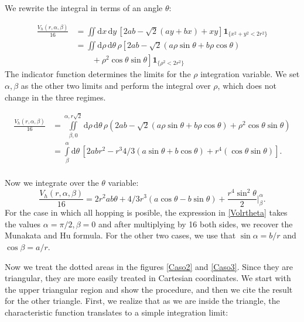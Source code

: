 \documentclass[superscriptaddress,pre,reprint,showpacs,twocolumn]{revtex4-1}
\newcommand{\rd}[1]{\mathrm{d}{#1} \,}
\newcommand{\indicatorsymbol}{\mathbf{1}}
\newcommand{\indicator}[1]{\indicatorsymbol_{ \{   #1 \} } }
\begin{document}
We rewrite the integral in terms of an angle $\theta$:

\begin{equation}\label{app:volcyl}
\begin{split}
\frac{V_h(r,\alpha,\beta)}{16} &=
\iint \rd x \rd y \left[ 2ab-\sqrt{2}(ay+bx)+x y \right]
\indicator{x^2 + y^2 < 2r^2}\\
&=
\iint \rd \rho \rd \theta \rho 
\left[ 2ab -\sqrt{2}(a\rho\sin\theta+b\rho\cos\theta) \right. \\
& \qquad + \left. \rho^2 \cos\theta\sin\theta \right]
\indicator{\rho^2<2r^2 }
\end{split}
\end{equation}
The indicator function determines the limits for the $\rho$ integration variable.
We set $\alpha, \beta$ as the other two limits and perform the
integral over $\rho$,  which does not change in the three regimes.
\begin{widetext}
\begin{equation}
  \begin{split}
    \frac{V_h(r,\alpha,\beta)}{16} &=
    \iint\limits_{\beta,0}^{\alpha,r\sqrt{2}} \rd \rho \rd \theta \rho
    \left( 2ab -\sqrt{2}(a\rho\sin\theta+b\rho\cos\theta) 
    +\rho^2 \cos\theta\sin\theta \right)\\
 &=\int\limits_\beta^{\alpha}  \rd \theta  
\left[ 2abr^2 - r^3 4/3 (a\sin\theta+b\cos\theta)+r^4 (\cos\theta\sin\theta) \right].\\
\end{split}
\end{equation}
\end{widetext}
Now we integrate over the $\theta$ variable:
\begin{equation}\label{Volrtheta}
  \frac{V_h(r,\alpha,\beta)}{16} = 2r^2ab\theta
  +4/3r^3(a\cos\theta-b\sin\theta)
  +\frac{r^4 \sin^2\theta}{2} \Bigg\vert_\beta^\alpha.
\end{equation}
For the case in which all hopping is posible, the expression in \eqref{Volrtheta}
takes the values $\alpha=\pi/2, \beta=0$ and after multiplying by 16 both sides,
we recover the Munakata and Hu formula. For the other two cases, we use that
$\sin \alpha = b / r$ and $\cos \beta = a / r$.


Now we treat the dotted areas in the figures \ref{Caso2} and \ref{Caso3}. Since they are triangular, they
are more easily treated in Cartesian coordinates. We start with the upper
triangular region
and show the procedure, and then we cite the result for the
other triangle.
First, we realize that as we are inside the triangle, the characteristic function
translates to a simple integration limit:
\end{document}
